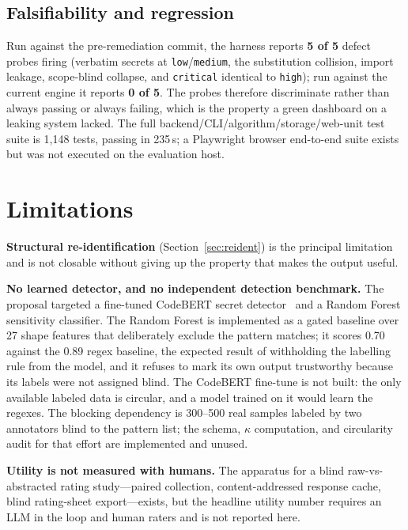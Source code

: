 \documentclass[conference]{IEEEtran}
\begin{document}
\subsection{Falsifiability and regression}

Run against the pre-remediation commit, the harness reports
\textbf{5 of 5} defect probes firing (verbatim secrets at
\texttt{low}/\texttt{medium}, the substitution collision, import leakage,
scope-blind collapse, and \texttt{critical} identical to \texttt{high});
run against the current engine it reports \textbf{0 of 5}. The probes
therefore discriminate rather than always passing or always failing, which
is the property a green dashboard on a leaking system lacked. The full
backend/CLI/algorithm/storage/web-unit test suite is 1{,}148 tests,
passing in 235\,s; a Playwright browser end-to-end suite exists but was
not executed on the evaluation host.

\section{Limitations}
\label{sec:limits}

\textbf{Structural re-identification} (Section~\ref{sec:reident}) is the
principal limitation and is not closable without giving up the property
that makes the output useful.

\textbf{No learned detector, and no independent detection benchmark.} The
proposal targeted a fine-tuned CodeBERT secret
detector~\cite{feng2020codebert} and a Random Forest sensitivity
classifier. The Random Forest is implemented as a gated baseline over 27
shape features that deliberately exclude the pattern matches; it scores
0.70 against the 0.89 regex baseline, the expected result of withholding
the labelling rule from the model, and it refuses to mark its own output
trustworthy because its labels were not assigned blind. The CodeBERT
fine-tune is not built: the only available labeled data is circular, and a
model trained on it would learn the regexes. The blocking dependency is
300--500 real samples labeled by two annotators blind to the pattern list;
the schema, $\kappa$ computation, and circularity audit for that effort
are implemented and unused.

\textbf{Utility is not measured with humans.} The apparatus for a blind
raw-vs-abstracted rating study---paired collection, content-addressed
response cache, blind rating-sheet export---exists, but the headline
utility number requires an LLM in the loop and human raters and is not
reported here.
\end{document}

